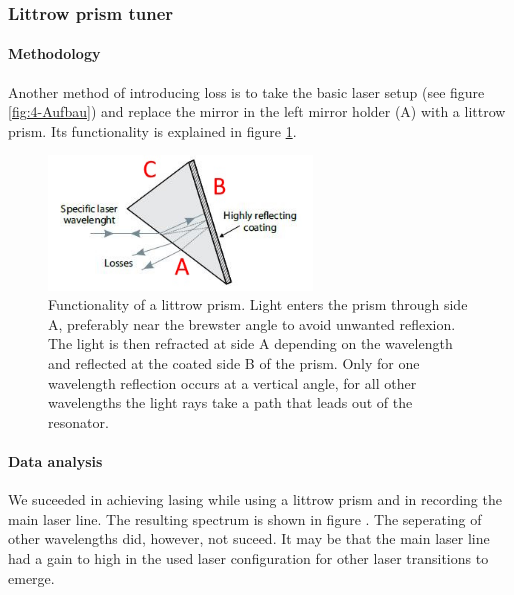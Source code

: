 \documentclass[../main.tex]{subfiles}
\begin{document}
\subsubsection{Littrow prism tuner}
    \paragraph{Methodology}
        Another method of introducing loss is to take the basic laser setup (see figure \ref{fig:4-Aufbau}) and replace the mirror in the left mirror holder (A) with a littrow prism. Its functionality is explained in figure \ref{fig:5-FunktionsweiseLitrrowprisma}.

        \begin{figure}[H]
            \centering 
            \includegraphics[width = 7cm]{Bilddateien/5/5-FunktionsweiseLitrrowprisma.jpg}
            \caption{Functionality of a littrow prism. Light enters the prism through side A, preferably near the brewster angle to avoid unwanted reflexion. The light is then refracted at side A depending on the wavelength and reflected at the coated side B of the prism. Only for one wavelength reflection occurs at a vertical angle, for all other wavelengths the light rays take a path that leads out of the resonator.}
            \label{fig:5-FunktionsweiseLitrrowprisma}
        \end{figure}

    \paragraph{Data analysis}
        We suceeded in achieving lasing while using a littrow prism and in recording the main laser line. The resulting spectrum is shown in figure . The seperating of other wavelengths did, however, not suceed. It may be that the main laser line had a gain to high in the used laser configuration for other laser transitions to emerge.
\end{document}

